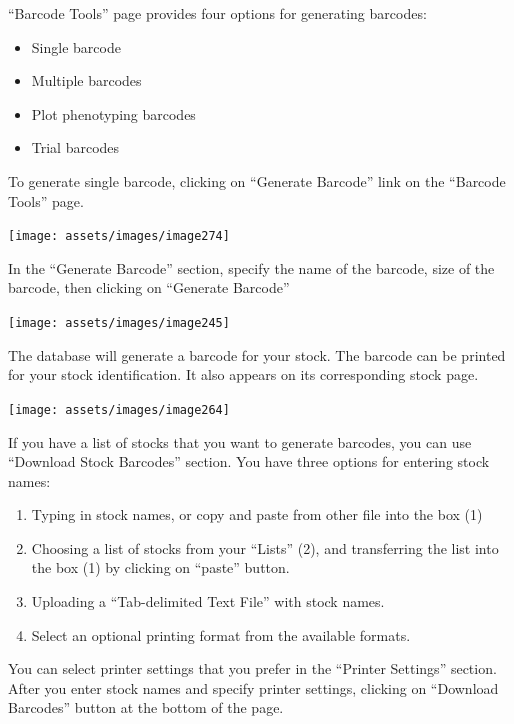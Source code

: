 \documentclass[
  12pt,
]{book}
\begin{document}
``Barcode Tools'' page provides four options for generating barcodes:

\begin{itemize}
\item
  Single barcode
\item
  Multiple barcodes
\item
  Plot phenotyping barcodes
\item
  Trial barcodes
\end{itemize}

To generate single barcode, clicking on ``Generate Barcode'' link on the ``Barcode Tools'' page.

\begin{center}\texttt{[image: assets/images/image274]} \end{center}

In the ``Generate Barcode'' section, specify the name of the barcode, size of the barcode, then clicking on ``Generate Barcode''

\begin{center}\texttt{[image: assets/images/image245]} \end{center}

The database will generate a barcode for your stock. The barcode can be printed for your stock identification. It also appears on its corresponding stock page.

\begin{center}\texttt{[image: assets/images/image264]} \end{center}

If you have a list of stocks that you want to generate barcodes, you can use ``Download Stock Barcodes'' section. You have three options for entering stock names:

\begin{enumerate}
\def\labelenumi{\arabic{enumi}.}
\item
  Typing in stock names, or copy and paste from other file into the box (1)
\item
  Choosing a list of stocks from your ``Lists'' (2), and transferring the list into the box (1) by clicking on ``paste'' button.
\item
  Uploading a ``Tab-delimited Text File'' with stock names.
\item
  Select an optional printing format from the available formats.
\end{enumerate}

You can select printer settings that you prefer in the ``Printer Settings'' section. After you enter stock names and specify printer settings, clicking on ``Download Barcodes'' button at the bottom of the page.
\end{document}
